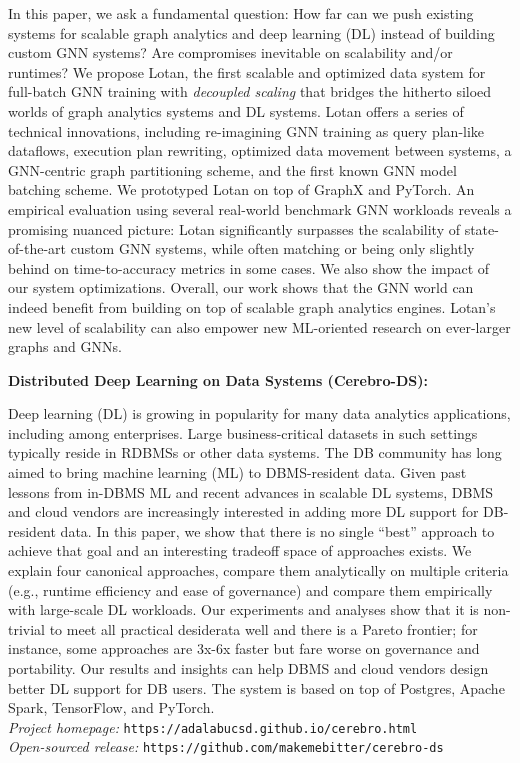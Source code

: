 \documentclass[margin,line]{res}
\begin{document}
\begin{resume}
In this paper, we ask a fundamental question: How far can we push existing systems for scalable graph analytics and deep learning (DL) instead of building custom GNN systems? Are compromises inevitable on scalability and/or runtimes? We propose Lotan, the first scalable and optimized data system for full-batch GNN training with \textit{decoupled scaling} that bridges the hitherto siloed worlds of graph analytics systems and DL systems. Lotan offers a series of technical innovations, including re-imagining GNN training as query plan-like dataflows, execution plan rewriting, optimized data movement between systems, a GNN-centric graph partitioning scheme, and the first known GNN model batching scheme. We prototyped Lotan on top of GraphX and PyTorch. An empirical evaluation using several real-world benchmark GNN workloads reveals a promising nuanced picture: Lotan significantly surpasses the scalability of state-of-the-art custom GNN systems, while often matching or being only slightly behind on time-to-accuracy metrics in some cases. We also show the impact of our system optimizations. Overall, our work shows that the GNN world can indeed benefit from building on top of scalable graph analytics engines. Lotan's new level of scalability can also empower new ML-oriented research on ever-larger graphs and GNNs.

{\bf Distributed Deep Learning on Data Systems (Cerebro-DS):}

Deep learning (DL) is growing in popularity for many data analytics applications, including among enterprises. Large business-critical datasets in such settings typically reside in RDBMSs or other data systems. The DB community has long aimed to bring machine learning (ML) to DBMS-resident data. Given past lessons from in-DBMS ML and recent advances in scalable DL systems, DBMS and cloud vendors are increasingly interested in adding more DL support for DB-resident data. In this paper, we show that there is no single ``best'' approach to achieve that goal and an interesting tradeoff space of approaches exists. We explain four canonical approaches, compare them analytically on multiple criteria (e.g., runtime efficiency and ease of governance) and compare them empirically with large-scale DL workloads. Our experiments and analyses show that it is non-trivial to meet all practical desiderata well and there is a Pareto frontier; for instance, some approaches are 3x-6x faster but fare worse on governance and portability. Our results and insights can help DBMS and cloud vendors design better DL support for DB users. The system is based on top of Postgres, Apache Spark, TensorFlow, and PyTorch. \\
\textit{Project homepage: }\texttt{https://adalabucsd.github.io/cerebro.html}\\
\textit{Open-sourced release: }\texttt{https://github.com/makemebitter/cerebro-ds}


\end{resume}
\end{document}

